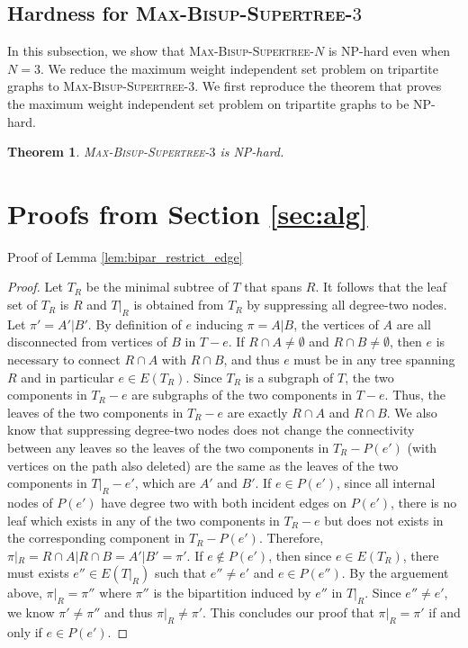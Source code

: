 \documentclass{bmcart}
\newtheorem{theorem}{Theorem}
\begin{document}
\subsection{Hardness for \textsc{Max-Bisup-Supertree-$3$}}
In this subsection, we show that \textsc{Max-Bisup-Supertree-$N$} is NP-hard even when $N = 3$. We reduce the maximum weight independent set problem on tripartite graphs to \textsc{Max-Bisup-Supertree-$3$}. We first reproduce the theorem that proves the maximum weight independent set problem on tripartite graphs to be NP-hard.


\begin{theorem}\label{thm:hardness}
\textsc{Max-Bisup-Supertree-$3$} is NP-hard.
\end{theorem}


\appendix
\section{Proofs from Section \ref{sec:alg}}

Proof of Lemma \ref{lem:bipar_restrict_edge}
\begin{proof}
Let $T_R$ be the minimal subtree of $T$ that spans $R$. It follows that the leaf set of $T_R$ is $R$ and $T|_R$ is obtained from $T_R$ by suppressing all degree-two nodes. Let $\pi' = A'|B'$.
By definition of $e$ inducing $\pi = A|B$, the vertices of $A$ are all disconnected from vertices of $B$ in $T-e$. If $R\cap A \neq \emptyset$ and $R\cap B \neq \emptyset$, then $e$ is necessary to connect $R\cap A$ with $R \cap B$, and thus $e$ must be in any tree spanning $R$ and in particular $e \in E(T_R)$. Since $T_R$ is a subgraph of $T$, the two components in $T_R-e$ are subgraphs of the two components in $T-e$. Thus, the leaves of the two components in $T_R-e$ are exactly $R\cap A$ and $R\cap B$. We also know that suppressing degree-two nodes does not change the connectivity between any leaves so the leaves of the two components in $T_R - P(e')$ (with vertices on the path also deleted) are the same as the leaves of the two components in $T|_R - e'$, which are $A'$ and $B'$. If $e \in P(e')$, since all internal nodes of $P(e')$ have degree two with both incident edges on $P(e')$, there is no leaf which exists in any of the two components in $T_R - e$ but does not exists in the corresponding component in $T_R-P(e')$. Therefore, $\pi|_R = R\cap A|R\cap B = A'|B' = \pi'$. If $e \notin P(e')$, then since $e \in E(T_R)$, there must exists $e'' \in E(T|_R)$ such that $e'' \neq e'$ and $e \in P(e'')$. By the arguement above, $\pi|_R = \pi''$ where $\pi''$ is the bipartition induced by $e''$ in $T|_R$. Since $e'' \neq e'$, we know $\pi' \neq \pi''$ and thus $\pi|_R \neq \pi'$. This concludes our proof that $\pi|_R = \pi'$ if and only if $e \in P(e')$. 
\end{proof}
\end{document}
